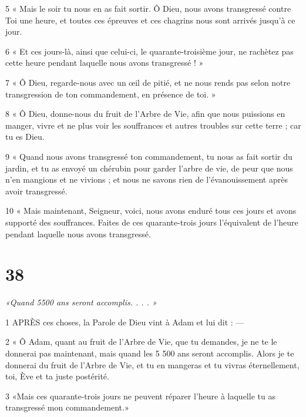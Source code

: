 \par 5 « Mais le soir tu nous en as fait sortir. Ô Dieu, nous avons transgressé contre Toi une heure, et toutes ces épreuves et ces chagrins nous sont arrivés jusqu'à ce jour.

\par 6 « Et ces jours-là, ainsi que celui-ci, le quarante-troisième jour, ne rachètez pas cette heure pendant laquelle nous avons transgressé ! »

\par 7 « Ô Dieu, regarde-nous avec un œil de pitié, et ne nous rends pas selon notre transgression de ton commandement, en présence de toi. »

\par 8 « Ô Dieu, donne-nous du fruit de l'Arbre de Vie, afin que nous puissions en manger, vivre et ne plus voir les souffrances et autres troubles sur cette terre ; car tu es Dieu.

\par 9 « Quand nous avons transgressé ton commandement, tu nous as fait sortir du jardin, et tu as envoyé un chérubin pour garder l'arbre de vie, de peur que nous n'en mangions et ne vivions ; et nous ne savons rien de l’évanouissement après avoir transgressé.

\par 10 « Mais maintenant, Seigneur, voici, nous avons enduré tous ces jours et avons supporté des souffrances. Faites de ces quarante-trois jours l’équivalent de l’heure pendant laquelle nous avons transgressé.

\chapter{38}

\par \textit{«Quand 5500 ans seront accomplis. . . . »}

\par 1 APRÈS ces choses, la Parole de Dieu vint à Adam et lui dit : —

\par 2 « Ô Adam, quant au fruit de l'Arbre de Vie, que tu demandes, je ne te le donnerai pas maintenant, mais quand les 5 500 ans seront accomplis. Alors je te donnerai du fruit de l'Arbre de Vie, et tu en mangeras et tu vivras éternellement, toi, Ève et ta juste postérité.

\par 3 «Mais ces quarante-trois jours ne peuvent réparer l'heure à laquelle tu as transgressé mon commandement.»

